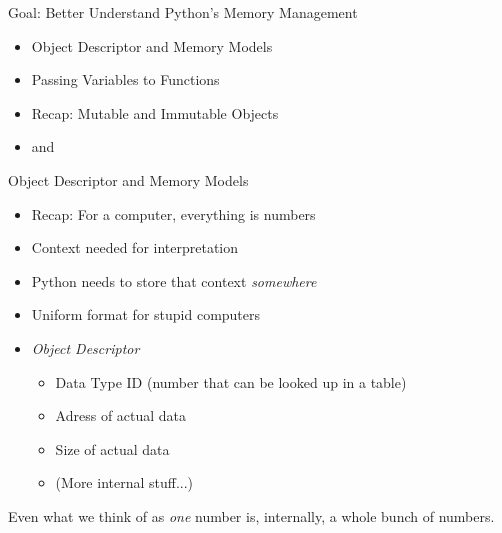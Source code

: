 
\begin{frame}[t,plain]
\titlepage
\end{frame}


\begin{frame}[fragile]{Goal: Better Understand Python's Memory Management}
%
\begin{itemize}
\item Object Descriptor and Memory Models
\item Passing Variables to Functions
\item Recap: Mutable and Immutable Objects
\item {} and 
\end{itemize}
%
\end{frame}


\begin{frame}[fragile]{Object Descriptor and Memory Models}
%
\begin{itemize}
\item Recap: For a computer, everything is numbers
\item Context needed for interpretation
\item Python needs to store that context \emph{somewhere}
\item Uniform format for stupid computers
\item \emph{Object Descriptor}
	\begin{itemize}
	\item Data Type ID (number that can be looked up in a table)
	\item Adress of actual data
	\item Size of actual data
	\item (More internal stuff...)
	\end{itemize}
\end{itemize}
%
\begin{hintbox}
Even what we think of as \emph{one} number is, internally, a whole bunch of numbers.
\end{hintbox}
%
\end{frame}


